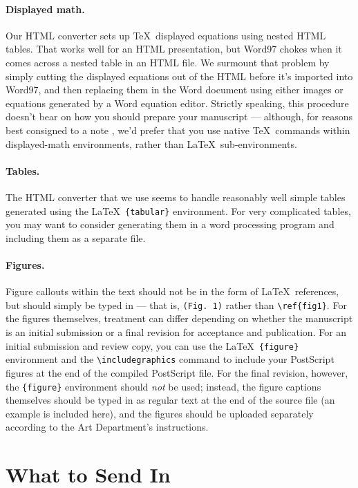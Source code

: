\documentclass[12pt]{article}
\begin{document}
\paragraph*{Displayed math.} Our HTML converter sets up \TeX\
displayed equations using nested HTML tables.  That works well for an
HTML presentation, but Word97 chokes when it comes across a nested
table in an HTML file.  We surmount that problem by simply cutting the
displayed equations out of the HTML before it's imported into Word97,
and then replacing them in the Word document using either images or
equations generated by a Word equation editor.  Strictly speaking,
this procedure doesn't bear on how you should prepare your manuscript
--- although, for reasons best consigned to a note \cite{nattex}, we'd
prefer that you use native \TeX\ commands within displayed-math
environments, rather than \LaTeX\ sub-environments.

\paragraph*{Tables.}  The HTML converter that we use seems to handle
reasonably well simple tables generated using the \LaTeX\
\texttt{\{tabular\}} environment.  For very complicated tables, you
may want to consider generating them in a word processing program and
including them as a separate file.

\paragraph*{Figures.}  Figure callouts within the text should not be
in the form of \LaTeX\ references, but should simply be typed in ---
that is, \verb+(Fig. 1)+ rather than \verb+\ref{fig1}+.  For the
figures themselves, treatment can differ depending on whether the
manuscript is an initial submission or a final revision for acceptance
and publication.  For an initial submission and review copy, you can
use the \LaTeX\ \verb+{figure}+ environment and the
\verb+\includegraphics+ command to include your PostScript figures at
the end of the compiled PostScript file.  For the final revision,
however, the \verb+{figure}+ environment should {\it not\/} be used;
instead, the figure captions themselves should be typed in as regular
text at the end of the source file (an example is included here), and
the figures should be uploaded separately according to the Art
Department's instructions.


\section*{What to Send In}
\end{document}
